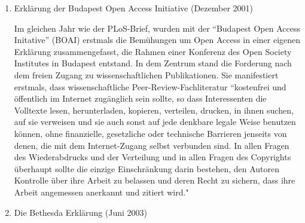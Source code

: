 \begin{enumerate}
\item Erklärung der Budapest Open Access Initiative (Dezember 2001)

Im gleichen Jahr wie der PLoS-Brief, wurden mit der “Budapest Open Access Initative” (BOAI)\cite{boai_2012} erstmals die Bemühungen um Open Access in einer eigenen Erklärung zusammengefasst\cite{cite:21a}, die Rahmen einer Konferenz des Open Society Institutes in Budapest entstand. In dem Zentrum stand die Forderung nach dem freien Zugang zu wissenschaftlichen Publikationen. Sie manifestiert erstmals, dass wissenschaftliche Peer-Review-Fachliteratur “kostenfrei und öffentlich im Internet zugänglich sein sollte, so dass Interessenten die Volltexte lesen, herunterladen, kopieren, verteilen, drucken, in ihnen suchen, auf sie verweisen und sie auch sonst auf jede denkbare legale Weise benutzen können, ohne finanzielle, gesetzliche oder technische Barrieren jenseits von denen, die mit dem Internet-Zugang selbst verbunden sind. In allen Fragen des Wiederabdrucks und der Verteilung und in allen Fragen des Copyrights überhaupt sollte die einzige Einschränkung darin bestehen, den Autoren Kontrolle über ihre Arbeit zu belassen und deren Recht zu sichern, dass ihre Arbeit angemessen anerkannt und zitiert wird."\cite{boai_2012} 
\item Die Bethesda Erklärung (Juni 2003)

\end{enumerate}
